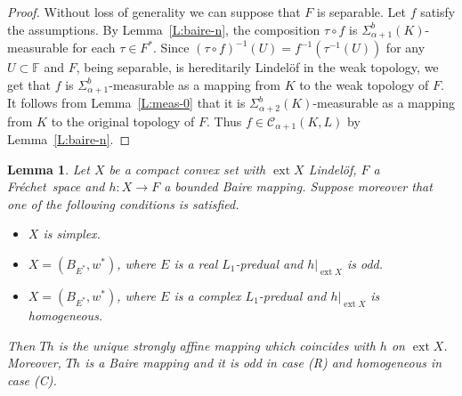 \documentclass{amsart}
\numberwithin{equation}{section}
\newtheorem{lemma}[thm]{Lemma}
\theoremstyle{definition}
\def\C{\mathcal C}
\def\ef{\mathbb F}
\def\r{|}
\def \ext {\operatorname{ext}}
\newcommand{\fr}{Fr\'echet\ }
\begin{document}
\begin{proof} Without loss of generality we can suppose that $F$ is separable. Let $f$ satisfy the assumptions. By Lemma~\ref{L:baire-n}, the composition $\tau\circ f$ is $\Sigma_{\alpha+1}^b(K)$-measurable for each $\tau\in F^*$. Since $(\tau\circ f)^{-1}(U)=f^{-1}(\tau^{-1}(U))$ for any $U\subset \ef$ and $F$, being separable, is hereditarily Lindel\"of in the weak topology, we get that $f$ is  $\Sigma_{\alpha+1}^b$-measurable as a mapping from $K$ to the weak topology of $F$. It follows from Lemma~\ref{L:meas-0} that it is  $\Sigma_{\alpha+2}^b(K)$-measurable as a mapping from $K$ to the original topology of $F$.
Thus $f\in\C_{\alpha+1}(K,L)$ by Lemma~\ref{L:baire-n}.
\end{proof}

\begin{lemma}\label{L:diri} Let $X$ be a compact convex set with $\ext X$ Lindel\"of, $F$ a \fr space and $h\colon X\to F$ a bounded Baire mapping.
Suppose moreover that one of the following conditions is satisfied.
\begin{itemize}
	\item[(S)] $X$ is simplex.
	\item[(R)] $X=(B_{E^*},w^*)$, where $E$ is a real $L_1$-predual and $h\r_{\ext X}$ is odd.
	\item[(C)] $X=(B_{E^*},w^*)$, where $E$ is a complex $L_1$-predual and $h\r_{\ext X}$ is homogeneous.
\end{itemize}
Then $Th$ is the unique strongly affine mapping which coincides with $h$ on $\ext X$.
Moreover, $Th$ is a Baire mapping and it is odd in case (R) and homogeneous in case (C).
\end{lemma}
\end{document}
